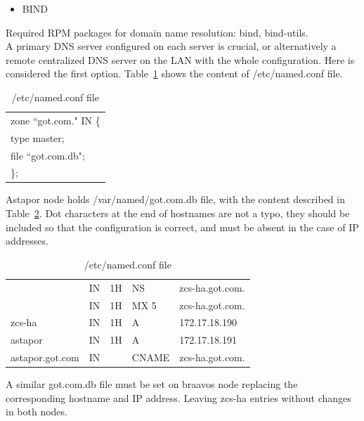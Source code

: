 \documentclass[a4paper, 12pt]{book}
\begin{document}
\begin{itemize}
	\item BIND
\end{itemize}

\noindent Required RPM packages for domain name resolution: bind, bind-utils.\\

\noindent A primary DNS server configured on each server is crucial, or alternatively a remote centralized DNS server on the LAN with the whole configuration. Here is considered the first option. Table~\ref{table:named} shows the content of /etc/named.conf file. 

\begin{table}
  \centering
  \begin{tabular}{ | l | }
    \hline
	  zone ``got.com." IN \{ \\
       type master; \\
       file ``got.com.db"; \\
       \}; \\
    \hline
  \end{tabular}
\caption{/etc/named.conf file}
\label{table:named}
\end{table}


\noindent Astapor node holds /var/named/got.com.db file, with the content described in Table~\ref{table:bindastapor}. Dot characters at the end of hostnames are not a typo, they should be included so that the configuration is correct, and must be absent in the case of IP addresses.

\begin{table}
  \centering
  \begin{tabular}{ | l l l l l | }
    \hline
	                  & IN & 1H & NS    & zcs-ha.got.com.\\
                      & IN & 1H & MX 5  & zcs-ha.got.com.\\
      zcs-ha          & IN & 1H & A     & 172.17.18.190\\
      astapor         & IN & 1H & A     & 172.17.18.191\\
      astapor.got.com & IN &    & CNAME & zcs-ha.got.com.\\
    \hline
  \end{tabular}
\caption{/etc/named.conf file}
\label{table:bindastapor}
\end{table}


\noindent A similar got.com.db file must be set on braavos node replacing the corresponding hostname and IP address. Leaving zcs-ha entries without changes in both nodes.
\end{document}
